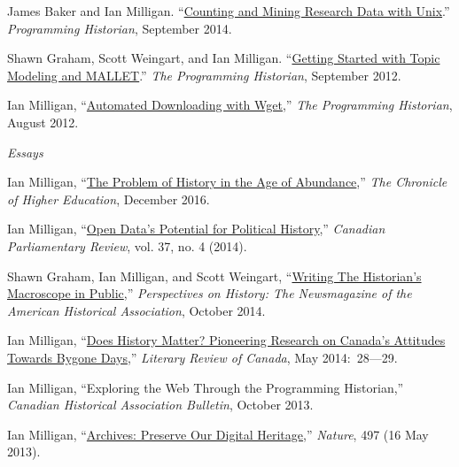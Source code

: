 \documentclass[11pt,article,oneside]{memoir}
\begin{document}
\ind James Baker and Ian Milligan. ``\href{http://programminghistorian.org/lessons/research-data-with-unix}{Counting and Mining Research Data with Unix}.'' \emph{Programming Historian}, September 2014.

\ind Shawn Graham, Scott Weingart, and Ian Milligan. ``\href{http://programminghistorian.org/lessons/topic-modeling-and-mallet}{Getting Started with Topic Modeling and MALLET}.'' \emph{The Programming Historian}, September 2012. 

\ind Ian Milligan, ``\href{http://programminghistorian.org/lessons/automated-downloading-with-wget}{Automated Downloading with Wget},'' \emph{The Programming Historian}, August 2012. 


\bigskip 

\noindent\emph{Essays \vspace{0.05in}}

\ind Ian Milligan, ``\href{http://www.chronicle.com/article/The-Problem-of-History-in-the/238600?key=tZ1LWdA_bVNIm62Zk-gE3HKlSrriqn6ZRqJ3qEr6mmtHr9z8eisDICSwzJhXAzpuMlp1d01xalVFZE41SVk0cmFfeTh2U0lRYTBOazNSQlYxQklNR1BzYzdRbw}{The Problem of History in the Age of Abundance},'' \emph{The Chronicle of Higher Education}, December 2016.

\ind Ian Milligan, ``\href{http://www.revparl.ca/37/4/37n4e_14_Milligan.pdf}{Open Data's Potential for Political History},'' \emph{Canadian Parliamentary Review}, vol. 37, no. 4 (2014).

\ind Shawn Graham, Ian Milligan, and Scott Weingart, ``\href{http://www.historians.org/publications-and-directories/perspectives-on-history/october-2014/writing-the-historian%E2%80%99s-macroscope-in-public}{Writing The Historian's Macroscope in Public},'' \emph{Perspectives on History: The Newsmagazine of the American Historical Association}, October 2014.

\ind Ian Milligan, ``\href{http://reviewcanada.ca/magazine/2014/05/does-history-matter/}{Does History Matter? Pioneering Research on Canada's Attitudes Towards Bygone Days},'' \emph{Literary Review of Canada}, May 2014:~28---29.

\ind Ian Milligan, ``Exploring the Web Through the Programming Historian,'' \emph{Canadian Historical Association Bulletin}, October 2013.

\ind Ian Milligan, ``\href{http://www.nature.com/nature/journal/v497/n7449/full/497317b.html}{Archives: Preserve Our Digital Heritage},'' \emph{Nature}, 497 (16 May 2013). 
\end{document}
